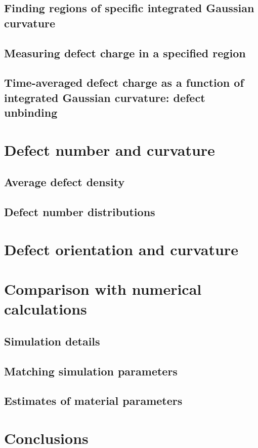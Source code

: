 \subsection{Finding regions of specific integrated Gaussian curvature}
\subsection{Measuring defect charge in a specified region}
\subsection{Time-averaged defect charge as a function of integrated Gaussian curvature: defect unbinding}

\section{Defect number and curvature}
\subsection{Average defect density}
\subsection{Defect number distributions}

\section{Defect orientation and curvature}

\section{Comparison with numerical calculations}
\subsection{Simulation details}
\subsection{Matching simulation parameters}
\subsection{Estimates of material parameters}

\section{Conclusions}

